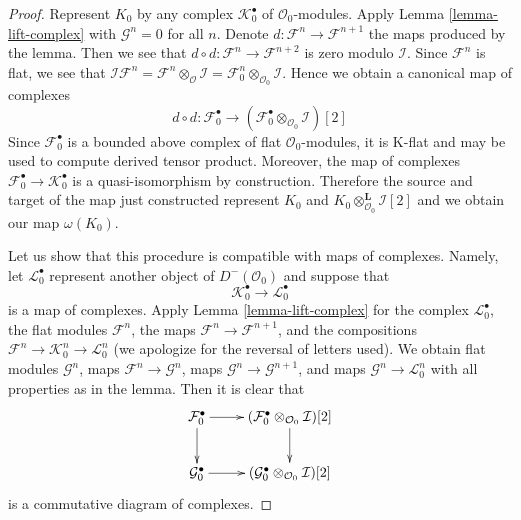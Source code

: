 \documentclass{stacks-project}
\theoremstyle{plain}
\theoremstyle{definition}
\theoremstyle{remark}
\numberwithin{equation}{subsection}
\begin{document}
\begin{proof}
Represent $K_0$ by any complex
$\mathcal{K}_0^\bullet$ of $\mathcal{O}_0$-modules.
Apply Lemma \ref{lemma-lift-complex}
with $\mathcal{G}^n = 0$ for all $n$.
Denote $d : \mathcal{F}^n \to \mathcal{F}^{n + 1}$
the maps produced by the lemma. Then we see that
$d \circ d : \mathcal{F}^n \to \mathcal{F}^{n + 2}$
is zero modulo $\mathcal{I}$. Since $\mathcal{F}^n$ is flat,
we see that
$\mathcal{I}\mathcal{F}^n =
\mathcal{F}^n \otimes_{\mathcal{O}} \mathcal{I} =
\mathcal{F}^n_0 \otimes_{\mathcal{O}_0} \mathcal{I}$.
Hence we obtain a canonical map of complexes
$$
d \circ d : \mathcal{F}_0^\bullet
\longrightarrow
(\mathcal{F}_0^\bullet \otimes_{\mathcal{O}_0} \mathcal{I})[2]
$$
Since $\mathcal{F}_0^\bullet$ is a bounded above complex
of flat $\mathcal{O}_0$-modules, it is K-flat and may be used
to compute derived tensor product. Moreover, the map of
complexes $\mathcal{F}_0^\bullet \to \mathcal{K}_0^\bullet$
is a quasi-isomorphism by construction. Therefore the source and
target of the map just constructed represent $K_0$ and
$K_0 \otimes_{\mathcal{O}_0}^\mathbf{L} \mathcal{I}[2]$
and we obtain our map $\omega(K_0)$.

\medskip\noindent
Let us show that this procedure is compatible with maps of complexes.
Namely, let $\mathcal{L}_0^\bullet$ represent another object of
$D^-(\mathcal{O}_0)$ and suppose that
$$
\mathcal{K}_0^\bullet \longrightarrow \mathcal{L}_0^\bullet
$$
is a map of complexes. Apply Lemma \ref{lemma-lift-complex}
for the complex $\mathcal{L}_0^\bullet$, the flat modules
$\mathcal{F}^n$, the maps $\mathcal{F}^n \to \mathcal{F}^{n + 1}$,
and the compositions
$\mathcal{F}^n \to \mathcal{K}_0^n \to \mathcal{L}_0^n$
(we apologize for the reversal of letters used).
We obtain flat modules $\mathcal{G}^n$, maps
$\mathcal{F}^n \to \mathcal{G}^n$, maps
$\mathcal{G}^n \to \mathcal{G}^{n + 1}$, and maps
$\mathcal{G}^n \to \mathcal{L}_0^n$ with all properties
as in the lemma. Then it is clear that
$$
\xymatrix{
\mathcal{F}_0^\bullet \ar[d] \ar[r] &
(\mathcal{F}_0^\bullet \otimes_{\mathcal{O}_0} \mathcal{I})[2] \ar[d] \\
\mathcal{G}_0^\bullet \ar[r] &
(\mathcal{G}_0^\bullet \otimes_{\mathcal{O}_0} \mathcal{I})[2]
}
$$
is a commutative diagram of complexes.


\end{proof}
\end{document}
